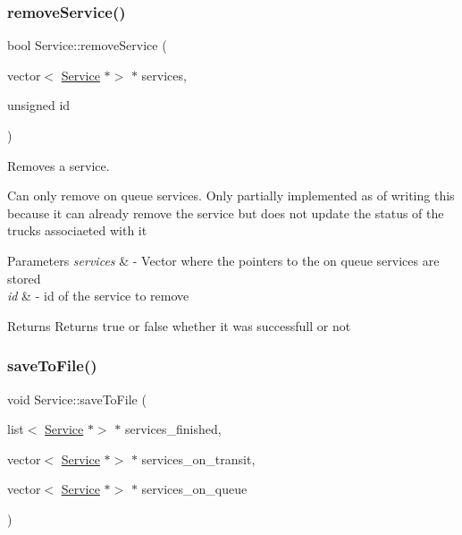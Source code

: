 \subsubsection{\texorpdfstring{remove\+Service()}{removeService()}}
{\footnotesize\ttfamily bool Service\+::remove\+Service (\begin{DoxyParamCaption}\item[{vector$<$ \hyperlink{class_service}{Service} $\ast$$>$ $\ast$}]{services,  }\item[{unsigned}]{id }\end{DoxyParamCaption})\hspace{0.3cm}{\ttfamily [static]}}



Removes a service. 

Can only remove on queue services. Only partially implemented as of writing this because it can already remove the service but does not update the status of the trucks associaeted with it


\begin{DoxyParams}{Parameters}
{\em services} & -\/ Vector where the pointers to the on queue services are stored \\
\hline
{\em id} & -\/ id of the service to remove \\
\hline
\end{DoxyParams}
\begin{DoxyReturn}{Returns}
Returns true or false whether it was successfull or not 
\end{DoxyReturn}
\mbox{\label{class_service_aa3672a3a070ca951f5b66075a5d4c339}} 
\subsubsection{\texorpdfstring{save\+To\+File()}{saveToFile()}}
{\footnotesize\ttfamily void Service\+::save\+To\+File (\begin{DoxyParamCaption}\item[{list$<$ \hyperlink{class_service}{Service} $\ast$$>$ $\ast$}]{services\+\_\+finished,  }\item[{vector$<$ \hyperlink{class_service}{Service} $\ast$$>$ $\ast$}]{services\+\_\+on\+\_\+transit,  }\item[{vector$<$ \hyperlink{class_service}{Service} $\ast$$>$ $\ast$}]{services\+\_\+on\+\_\+queue }\end{DoxyParamCaption})\hspace{0.3cm}{\ttfamily [static]}}



